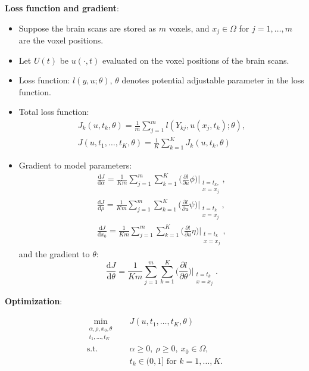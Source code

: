 \documentclass[12pt]{article}
\newcommand{\rmd}{\mathrm{d}}
\newcommand{\tst}{\textrm{s.t.}}
\newcommand{\pp}{\partial}
\begin{document}
\noindent\textbf{Loss function and gradient}:
\begin{itemize}[leftmargin=*,noitemsep,topsep=0pt]
    \item Suppose the brain scans are stored as $m$ voxels, and $x_j \in \Omega$ for $j = 1, \ldots, m$ are the voxel positions.
    \item Let $U(t)$ be $u(\cdot, t)$ evaluated on the voxel positions of the brain scans.
    \item Loss function: $l(y, u; \theta)$, $\theta$ denotes potential adjustable parameter in the loss function.
    \item Total loss function:
    \begin{equation}
    \begin{split}
    J_k(u, t_k, \theta) = \frac{1}{m} \sum_{j=1}^m l(Y_{kj}, u(x_j, t_k); \theta),\\
    J(u, t_1, \ldots, t_K, \theta) = \frac{1}{K} \sum_{k=1}^K J_k(u, t_k, \theta)
    \end{split}
    \end{equation}
    \item Gradient to model parameters:
    \begin{equation}
    \begin{split}
    \frac{\rmd J}{\rmd \alpha} = \frac{1}{Km} \sum_{j=1}^m \sum_{k=1}^K \bigg(\frac{\pp l}{\pp u} \phi\bigg)\bigg|_{\substack{t=t_k,\\x=x_j}}, \\
    \frac{\rmd J}{\rmd \rho} = \frac{1}{Km} \sum_{j=1}^m \sum_{k=1}^K \bigg(\frac{\pp l}{\pp u} \psi\bigg)\bigg|_{\substack{t=t_k\\x=x_j}}, \\
    \frac{\rmd J}{\rmd x_0} = \frac{1}{Km} \sum_{j=1}^m \sum_{k=1}^K \bigg(\frac{\pp l}{\pp u} \eta\bigg)\bigg|_{\substack{t=t_k\\x=x_j}},
    \end{split}
    \end{equation} 
    and the gradient to $\theta$:
    \begin{equation}
    \frac{\rmd J}{\rmd \theta} = \frac{1}{Km} \sum_{j=1}^m \sum_{k=1}^K \bigg(\frac{\pp l}{\pp \theta} \bigg)\bigg|_{\substack{t=t_k\\x=x_j}}.
    \end{equation}
\end{itemize}

\noindent\textbf{Optimization}:

\begin{equation}
\begin{split}
\min_{\substack{\alpha, \rho, x_0, \theta \\ t_1, \ldots, t_K}} &\quad J(u, t_1, \ldots, t_K, \theta) \\
\tst &\quad  \alpha \geq 0, \ \rho \geq 0, \  x_0 \in \Omega, \\
&\quad t_k \in (0, 1] \text{ for } k = 1, \ldots, K.
\end{split}
\end{equation}
\end{document}
